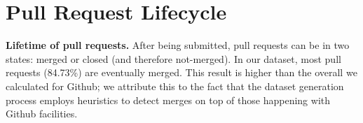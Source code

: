 \documentclass{sig-alternate}
\begin{document}
%


\noindent
{}
%

%

\section{Pull Request Lifecycle}
\label{sec:pullreqchar}

\textbf{Lifetime of pull requests.}
After being submitted, pull requests can be in two states: merged or closed
(and therefore not-merged).
In our dataset, most pull requests (84.73\%) are eventually
merged. This result is higher than the overall we calculated for
Github; we attribute this to the fact that the dataset generation
process employs heuristics to detect merges on top of those happening
with Github facilities.
\end{document}
